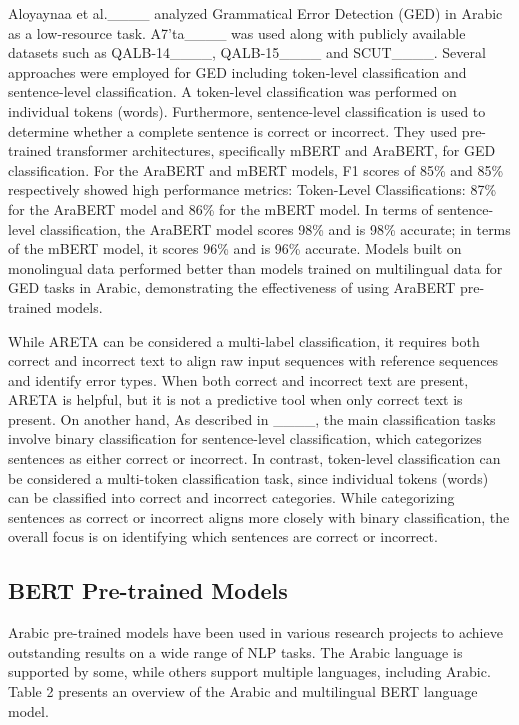 Aloyaynaa et al.____ analyzed Grammatical Error Detection (GED) in Arabic as a low-resource task. A7'ta____ was used along with publicly available datasets such as  QALB-14____, QALB-15____ and SCUT____. Several approaches were employed for GED including token-level classification and sentence-level classification. A token-level classification was performed on individual tokens (words). Furthermore, sentence-level classification is used to determine whether a complete sentence is correct or incorrect. They used pre-trained transformer architectures, specifically mBERT and AraBERT, for GED classification. For the AraBERT and mBERT models, F1 scores of 85\% and 85\% respectively showed high performance metrics: Token-Level Classifications: 87\% for the AraBERT model and 86\% for the mBERT model. In terms of sentence-level classification, the AraBERT model scores 98\% and is 98\% accurate; in terms of the mBERT model, it scores 96\% and is 96\% accurate. Models built on monolingual data performed better than models trained on multilingual data for GED tasks in Arabic, demonstrating the effectiveness of using AraBERT pre-trained models.


While ARETA can be considered a multi-label classification, it requires both correct and incorrect text to align raw input sequences with reference sequences and identify error types. When both correct and incorrect text are present, ARETA is helpful, but it is not a predictive tool when only correct text is present. On another hand, As described in ____, the main classification tasks involve binary classification for sentence-level classification, which categorizes sentences as either correct or incorrect. In contrast, token-level classification can be considered a multi-token classification task, since individual tokens (words) can be classified into correct and incorrect categories. While categorizing sentences as correct or incorrect aligns more closely with binary classification, the overall focus is on identifying which sentences are correct or incorrect. 
 \subsection{BERT Pre-trained Models}
Arabic pre-trained models have been used in various research projects to achieve outstanding results on a wide range of NLP tasks. The Arabic language is supported by some, while others support multiple languages, including Arabic. Table 2 presents an overview of the Arabic and multilingual BERT language model.

